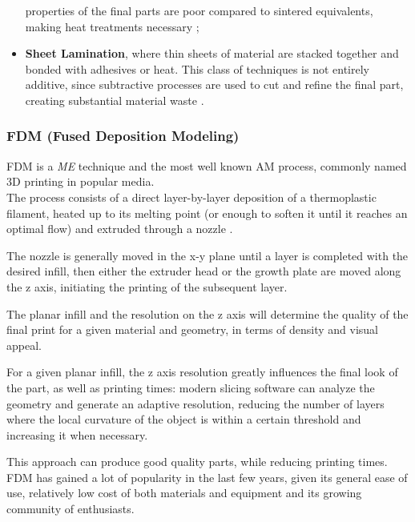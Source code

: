 \documentclass{article}
\begin{document}
\begin{itemize}
                        properties of the final parts are poor compared to sintered equivalents, making heat treatments necessary \autocite*{Recent_progress_polymers_AM};
        \item \textbf{Sheet Lamination}, where thin sheets of material are stacked together and bonded with adhesives or heat. This class of techniques 
                        is not entirely additive, since subtractive processes are used to cut and refine the final part, creating substantial material waste \autocite*{Recent_progress_polymers_AM}.
    \end{itemize} \clearpage

    \subsubsection{FDM (Fused Deposition Modeling) \label{FDM_general}}

    FDM is a \textit{ME} technique and the most well known AM process, commonly named 3D printing in popular media. \\
    
    The process consists of a direct layer-by-layer deposition of a thermoplastic filament, heated up to its melting point (or enough to soften it until it reaches an 
    optimal flow) and extruded through a nozzle \autocites*{Recent_progress_polymers_AM}{Kovalcik_PHA_Review}. 

    The nozzle is generally moved in the x-y plane until a layer is completed with the desired infill, then either the extruder head or the growth plate are moved along the z axis, 
    initiating the printing of the subsequent layer.

    The planar infill and the resolution on the z axis will determine the quality of the final print for a given material and geometry, in terms of density and visual appeal.
    
    For a given planar infill, the z axis resolution greatly influences the final look of the part, as well as printing times:
    modern slicing software can analyze the geometry and generate an adaptive resolution, reducing the number of layers where the local  
    curvature of the object is within a certain threshold and increasing it when necessary. 
    
    This approach can produce good quality parts, 
    while reducing printing times. \\ 
    
    FDM has gained a lot of popularity in the last few years, given its general ease of use, relatively low cost of both materials and equipment and its growing 
    community of enthusiasts. \\
\end{document}
